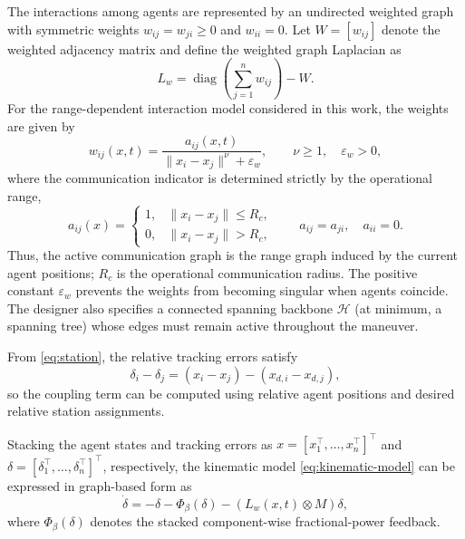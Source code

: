 \documentclass[letterpaper,10pt,conference]{ieeeconf}
\begin{document}
The interactions among agents are represented by an undirected weighted graph with symmetric weights $w_{ij}=w_{ji}\geq0$ and $w_{ii}=0$. Let $W=[w_{ij}]$ denote the weighted adjacency matrix and define the weighted graph Laplacian as
\begin{equation}
    L_w=\operatorname{diag}\left(\sum_{j=1}^{n}w_{ij}\right)-W.
    \label{eq:laplacian}
\end{equation}
For the range-dependent interaction model considered in this work, the weights are given by
\begin{equation}
    w_{ij}(x,t)=
    \frac{a_{ij}(x,t)}
    {\|x_i-x_j\|^\nu+\varepsilon_w},
    \qquad \nu\geq1,\quad \varepsilon_w>0,
    \label{eq:weights}
\end{equation}
where the communication indicator is determined strictly by the operational range,
\begin{equation}
 a_{ij}(x)=\begin{cases}1,&\|x_i-x_j\|\leq R_c,\\0,&\|x_i-x_j\|>R_c,\end{cases}
 \qquad a_{ij}=a_{ji},\quad a_{ii}=0.
 \label{eq:range-graph}
\end{equation}
Thus, the active communication graph is the range graph induced by the current agent positions; $R_c$ is the operational communication radius. The positive constant $\varepsilon_w$ prevents the weights from becoming singular when agents coincide. The designer also specifies a connected spanning backbone $\mathcal H$ (at minimum, a spanning tree) whose edges must remain active throughout the maneuver.

From \eqref{eq:station}, the relative tracking errors satisfy
\begin{equation}
    \delta_i-\delta_j=(x_i-x_j)-(x_{d,i}-x_{d,j}),
    \label{eq:distributed-error}
\end{equation}
so the coupling term can be computed using relative agent positions and desired relative station assignments.

Stacking the agent states and tracking errors as
$x=[x_1^\top,\ldots,x_n^\top]^\top$ and
$\delta=[\delta_1^\top,\ldots,\delta_n^\top]^\top$, respectively, the kinematic model \eqref{eq:kinematic-model} can be expressed in graph-based form as
\begin{equation}
    \dot{\delta}
    =-\delta-\Phi_\beta(\delta)
    -(L_w(x,t)\otimes M)\delta,
    \label{eq:error-dynamics}
\end{equation}
where $\Phi_\beta(\delta)$ denotes the stacked component-wise fractional-power feedback.
\end{document}
